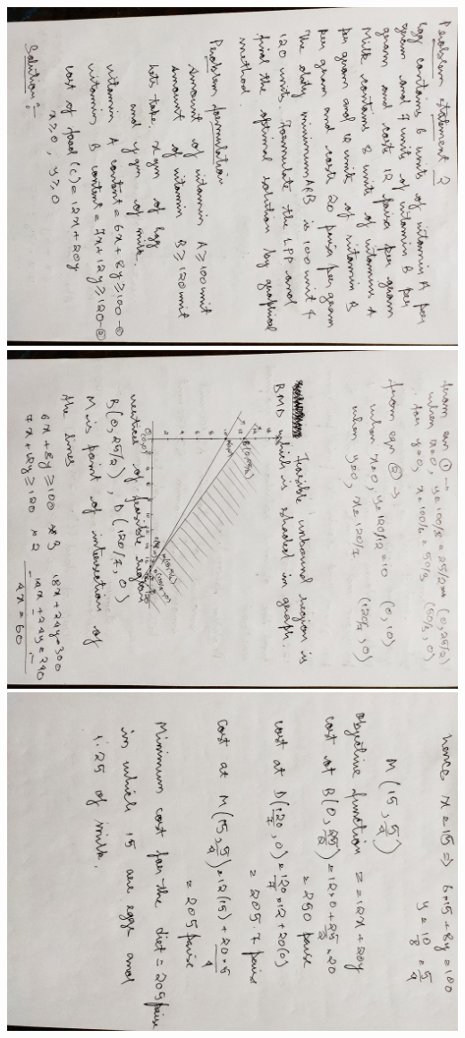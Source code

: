 \documentclass[12pt, letterpaper, twoside]{book}
\begin{document}
\includegraphics[width=\paperheight, height=\paperwidth, angle=90]{Page6}
\includegraphics[width=\paperheight, height=\paperwidth, angle=90]{Page7}
\includegraphics[width=\paperheight, height=\paperwidth, angle=90]{Page8}
\end{document}
